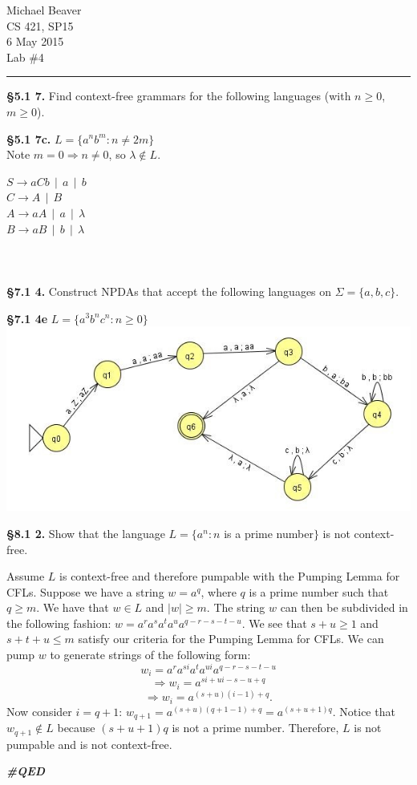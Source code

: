 \documentclass[12pt,letter]{article}
\newcommand{\QED}{
	\begin{flushright}
		\textit{\textbf{\#QED}}
	\end{flushright}
}
\begin{document}
Michael Beaver\\
CS 421, SP15\\
6 May 2015 \\
Lab \#4 
\hrule

\textbf{\S 5.1 7.} Find context-free grammars for the following languages (with $n \geq 0$, $m \geq 0$).

\textbf{\S 5.1 7c.} $L = \{ a^n b^m : n \neq 2m \}$\\
Note $m = 0 \Rightarrow n \neq 0$, so $\lambda \not\in L$.

$S \rightarrow aCb \ \ | \ \ a \ \ | \ \ b $\\
$C \rightarrow A \ \ | \ \ B$\\
$A \rightarrow aA \ \ | \ \ a \ \ | \ \ \lambda$\\
$B \rightarrow aB \ \ | \ \ b \ \ | \ \ \lambda$\\

\ \\
\ \\
\ \\

\textbf{\S 7.1 4.} Construct NPDAs that accept the following languages on $\Sigma = \{ a, b, c \}$.

\textbf{\S 7.1 4e}  $L = \{ a^3 b^n c^n : n \geq 0\}$\\
\includegraphics[scale=1]{714e.jpg}

\newpage

\textbf{\S 8.1 2.} Show that the language $L = \{ a^n : n$ is a prime number$\}$ is not context-free.

Assume $L$ is context-free and therefore pumpable with the Pumping Lemma for CFLs. Suppose we have a string $w = a^q$, where $q$ is a prime number such that $q \geq m$. We have that $w \in L$ and $|w| \geq m$. The string $w$ can then be subdivided in the following fashion: $w = a^r a^s a^t a^u a^{q-r-s-t-u}$. We see that $s + u \geq 1$ and $s + t + u \leq m$ satisfy our criteria for the Pumping Lemma for CFLs. We can pump $w$ to generate strings of the following form: 
$$w_i = a^r a^{si} a^t a^{ui} a^{q-r-s-t-u}$$
$$\Rightarrow w_i = a^{si + ui - s - u + q}$$
$$\Rightarrow w_i = a^{(s + u)(i - 1) + q}.$$
Now consider $i = q + 1$: $w_{q+1} = a^{(s+u)(q+1-1)+q} = a^{(s+u+1)q}$. Notice that $w_{q+1} \not\in L$ because $(s+u+1)q$ is not a prime number. Therefore, $L$ is not pumpable and is not context-free. \QED
\end{document}
